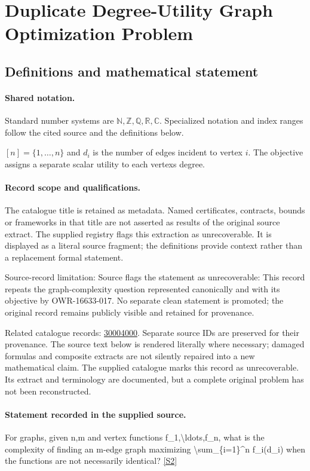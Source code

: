 \documentclass[11pt]{article}
\newcommand{\sref}[2]{\hyperlink{source:#1:#2}{[S#2]}}
\begin{document}
\section{Duplicate Degree-Utility Graph Optimization Problem}\label{statement}

\subsection{Definitions and mathematical statement}

\paragraph{Shared notation.}Standard number systems are $\mathbb N,\mathbb Z,\mathbb Q,\mathbb R,\mathbb C$. Specialized notation and index ranges follow the cited source and the definitions below.


$[n]=\{1,\ldots,n\}$ and $d_i$ is the number of edges incident to vertex $i$. The objective assigns a separate scalar utility to each vertex\textquotesingle s degree.
\paragraph{Record scope and qualifications.}
The catalogue title is retained as metadata. Named certificates, contracts, bounds or frameworks in that title are not asserted as results of the original source extract.
The supplied registry flags this extraction as unrecoverable. It is displayed as a literal source fragment; the definitions provide context rather than a replacement formal statement.

Source-record limitation: Source flags the statement as unrecoverable: This record repeats the graph-complexity question represented canonically and with its objective by OWR-16633-017. No separate clean statement is promoted; the original record remains publicly visible and retained for provenance.

Related catalogue records: \href{https://mehmetmars7.github.io/Erdosproblems-llm-hunter/problem.html?type=open_problems&id=30004000}{30004000}. Separate source IDs are preserved for their provenance.
The source text below is rendered literally where necessary; damaged formulas and composite extracts are not silently repaired into a new mathematical claim.
The supplied catalogue marks this record as unrecoverable. Its extract and terminology are documented, but a complete original problem has not been reconstructed.
\paragraph{Statement recorded in the supplied source.}
For graphs, given n,m and vertex functions f\_1,\textbackslash{}ldots,f\_n, what is the complexity of finding an m-edge graph maximizing \textbackslash{}sum\_\{i=1\}\textasciicircum{}n f\_i(d\_i) when the functions are not necessarily identical? \sref{statement}{2}
\end{document}
